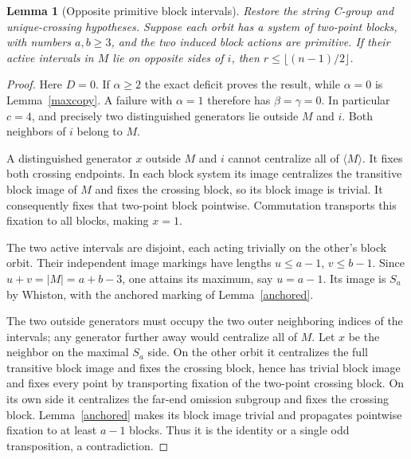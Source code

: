 \documentclass[11pt,a4paper]{article}
\newtheorem{lemma}{Lemma}
\newcommand{\gen}[1]{\langle#1\rangle}
\begin{document}
\begin{lemma}[Opposite primitive block intervals]\label{twocopy}
Restore the string C-group and unique-crossing hypotheses.
Suppose each orbit has a system of two-point blocks, with numbers
$a,b\geq3$, and the two induced block actions are primitive.
If their active intervals in $M$ lie on opposite sides of $i$,
then $r\leq\lfloor(n-1)/2\rfloor$.
\end{lemma}
\begin{proof}
Here $D=0$. If $\alpha\geq2$ the exact deficit proves the result,
while $\alpha=0$ is Lemma~\ref{maxcopy}. A failure with
$\alpha=1$ therefore has $\beta=\gamma=0$. In particular
$c=4$, and precisely two distinguished generators lie outside
$M$ and $i$. Both neighbors of $i$ belong to $M$.

A distinguished generator $x$ outside $M$ and $i$ cannot
centralize all of $\gen M$. It fixes both crossing endpoints.
In each block system its image centralizes the transitive block
image of $M$ and fixes the crossing block, so its block image
is trivial. It consequently fixes that two-point block pointwise.
Commutation transports this fixation to all blocks, making $x=1$.

The two active intervals are disjoint, each acting trivially on
the other's block orbit. Their independent image markings have
lengths $u\leq a-1$, $v\leq b-1$. Since
$u+v=|M|=a+b-3$, one attains its maximum, say $u=a-1$.
Its image is $S_a$ by Whiston, with the anchored marking of
Lemma~\ref{anchored}.

The two outside generators must occupy the two outer neighboring
indices of the intervals; any generator further away would
centralize all of $M$. Let $x$ be the neighbor on the maximal
$S_a$ side. On the other orbit it centralizes the full transitive
block image and fixes the crossing block, hence has trivial block
image and fixes every point by transporting fixation of the
two-point crossing block. On its own side it centralizes the
far-end omission subgroup and fixes the crossing block.
Lemma~\ref{anchored} makes its block image trivial and propagates
pointwise fixation to at least $a-1$ blocks. Thus it is the
identity or a single odd transposition, a contradiction.
\end{proof}
\end{document}
